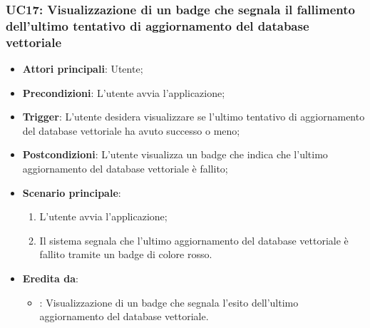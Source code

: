 \subsubsection{UC17: Visualizzazione di un badge che segnala il fallimento dell'ultimo tentativo di aggiornamento del database vettoriale}
\begin{itemize}
    \item \textbf{Attori principali}: Utente;
    \item \textbf{Precondizioni}: L'utente avvia l'applicazione;
    \item \textbf{Trigger}: L'utente desidera visualizzare se l'ultimo tentativo di aggiornamento del database vettoriale
    ha avuto successo o meno;
    \item \textbf{Postcondizioni}: L'utente visualizza un badge che indica che l'ultimo aggiornamento del database vettoriale
    è fallito;
    \item \textbf{Scenario principale}:
    \begin{enumerate}
        \item L'utente avvia l'applicazione;
        \item Il sistema segnala che l'ultimo aggiornamento del database vettoriale è fallito tramite un badge di colore rosso.
    \end{enumerate}
    \item \textbf{Eredita da}:
    \begin{itemize}
        \item {}: Visualizzazione di un badge che segnala l'esito dell'ultimo aggiornamento del database vettoriale.
    \end{itemize}
\end{itemize}
